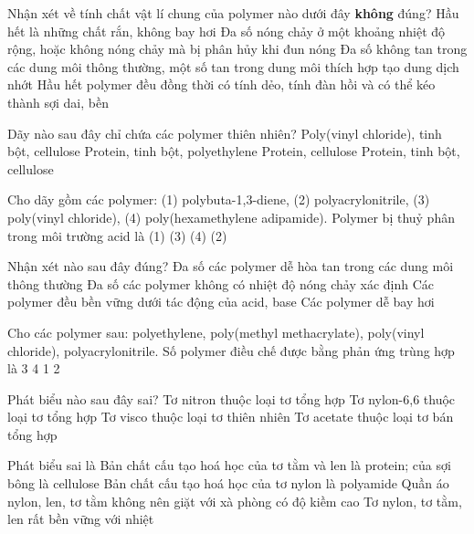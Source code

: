 \documentclass[11pt,a4paper]{article}
\def\loigiai#1{}
\begin{document}
\begin{ex}
Nhận xét về tính chất vật lí chung của polymer nào dưới đây \textbf{không} đúng?
\choice
{Hầu hết là những chất rắn, không bay hơi}
{Đa số nóng chảy ở một khoảng nhiệt độ rộng, hoặc không nóng chảy mà bị phân hủy khi đun nóng}
{Đa số không tan trong các dung môi thông thường, một số tan trong dung môi thích hợp tạo dung dịch nhớt}
{Hầu hết polymer đều đồng thời có tính dẻo, tính đàn hồi và có thể kéo thành sợi dai, bền}
\loigiai{}
\end{ex}

\newpage

\begin{ex}
Dãy nào sau đây chỉ chứa các polymer thiên nhiên?
\choice
{Poly(vinyl chloride), tinh bột, cellulose}
{Protein, tinh bột, polyethylene}
{Protein, cellulose}
{Protein, tinh bột, cellulose}
\loigiai{}
\end{ex}

\begin{ex}
Cho dãy gồm các polymer: (1) polybuta-1,3-diene, (2) polyacrylonitrile, (3) poly(vinyl chloride), (4) poly(hexamethylene adipamide). Polymer bị thuỷ phân trong môi trường acid là
\choice
{(1)}
{(3)}
{(4)}
{(2)}
\loigiai{}
\end{ex}

\begin{ex}
Nhận xét nào sau đây đúng?
\choice
{Đa số các polymer dễ hòa tan trong các dung môi thông thường}
{Đa số các polymer không có nhiệt độ nóng chảy xác định}
{Các polymer đều bền vững dưới tác động của acid, base}
{Các polymer dễ bay hơi}
\loigiai{}
\end{ex}

\begin{ex}
Cho các polymer sau: polyethylene, poly(methyl methacrylate), poly(vinyl chloride), polyacrylonitrile. Số polymer điều chế được bằng phản ứng trùng hợp là
\choice
{3}
{4}
{1}
{2}
\loigiai{}
\end{ex}

\begin{ex}
Phát biểu nào sau đây sai?
\choice
{Tơ nitron thuộc loại tơ tổng hợp}
{Tơ nylon-6,6 thuộc loại tơ tổng hợp}
{Tơ visco thuộc loại tơ thiên nhiên}
{Tơ acetate thuộc loại tơ bán tổng hợp}
\loigiai{}
\end{ex}

\begin{ex}
Phát biểu sai là
\choice
{Bản chất cấu tạo hoá học của tơ tằm và len là protein; của sợi bông là cellulose}
{Bản chất cấu tạo hoá học của tơ nylon là polyamide}
{Quần áo nylon, len, tơ tằm không nên giặt với xà phòng có độ kiềm cao}
{Tơ nylon, tơ tằm, len rất bền vững với nhiệt}
\loigiai{}
\end{ex}
\end{document}
